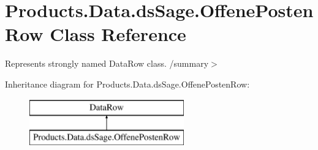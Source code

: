 \hypertarget{class_products_1_1_data_1_1ds_sage_1_1_offene_posten_row}{}\section{Products.\+Data.\+ds\+Sage.\+Offene\+Posten\+Row Class Reference}
\label{class_products_1_1_data_1_1ds_sage_1_1_offene_posten_row}


Represents strongly named Data\+Row class. /summary$>$  


Inheritance diagram for Products.\+Data.\+ds\+Sage.\+Offene\+Posten\+Row\+:\begin{figure}[H]
\begin{center}
\leavevmode
\includegraphics[height=2.000000cm]{class_products_1_1_data_1_1ds_sage_1_1_offene_posten_row}
\end{center}
\end{figure}
